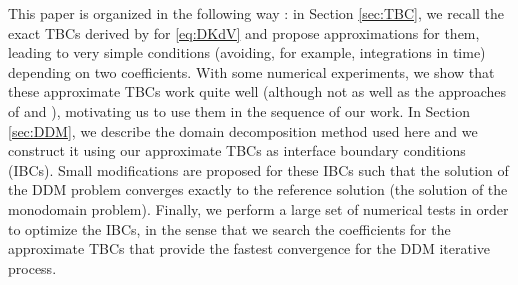 \indent This paper is organized in the following way : in Section \ref{sec:TBC}, we recall the exact TBCs derived by \cite{zheng2008} for \eqref{eq:DKdV} and propose approximations for them, leading to very simple conditions (avoiding, for example, integrations in time) depending on two coefficients. With some numerical experiments, we show that these approximate TBCs work quite well (although not as well as the approaches of \cite{zheng2008} and \cite{besse2015}), motivating us to use them in the sequence of our work. In Section \ref{sec:DDM}, we describe the domain decomposition method used here and we construct it using our approximate TBCs as interface boundary conditions (IBCs). Small modifications are proposed for these IBCs such that the solution of the DDM problem converges exactly to the reference solution (the solution of the monodomain problem). Finally, we perform a large set of numerical tests in order to optimize the IBCs, in the sense that we search the coefficients for the approximate TBCs that provide the fastest convergence for the DDM iterative process.